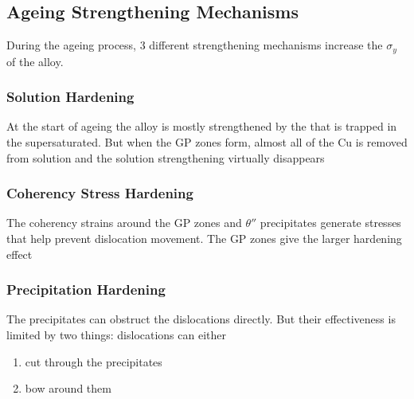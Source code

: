 
\subsection{Ageing Strengthening Mechanisms} %
\label{sub:ageing_strengthening_mechanisms}



During the ageing process, 3 different strengthening mechanisms increase the $\sigma_y$ of the alloy.

\subsubsection{Solution Hardening} %
\label{ssub:solution_hardening}

At the start of ageing the alloy is mostly strengthened by the  that is trapped in the supersaturated. But when the GP zones form, almost all of the Cu is removed from solution and the solution strengthening virtually disappears 

\subsubsection{Coherency Stress Hardening} %
\label{ssub:coherency_stress_hardening}

The coherency strains around the GP zones and $\theta''$ precipitates generate stresses that help prevent dislocation movement. The GP zones give the larger hardening effect


\subsubsection{Precipitation Hardening} %
\label{ssub:precipitation_hardening}

The precipitates can obstruct the dislocations directly. But their effectiveness is limited by two things: dislocations can either
\begin{enumerate}
  \item cut through the precipitates
  \item bow around them
\end{enumerate}


